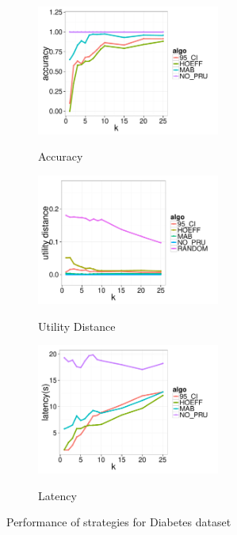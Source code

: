 \begin{figure}[t]
	\centering
	\begin{subfigure}{0.33\linewidth}
		\centering
		{\includegraphics[width=6cm] {Images/in_memory_dia_accuracy.pdf}}
		\caption{Accuracy}
		\label{fig:dia_accuracy}
	\end{subfigure}
	\begin{subfigure}{0.33\linewidth}
		\centering
		{\includegraphics[width=6cm] {Images/in_memory_dia_utility_dist.pdf}}
		\caption{Utility Distance}
		\label{fig:dia_utility_dist}
	\end{subfigure}
	\begin{subfigure}{0.33\linewidth}
		\centering
		{\includegraphics[width=6cm] {Images/in_memory_dia_latency.pdf}}
		\caption{Latency}
		\label{fig:diabetes_latency}
	\end{subfigure}
	\vspace{-10pt}
	\caption{Performance of strategies for Diabetes dataset}
	\label{fig:diabetes_perf}
	\vspace{-10pt}
\end{figure}

